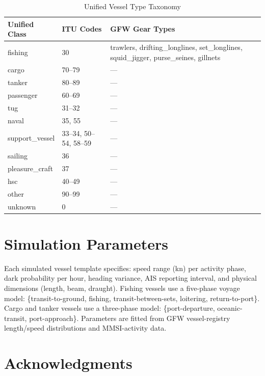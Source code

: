 \documentclass[journal]{IEEEtran}
\begin{document}
\begin{table}[!h]
  \caption{Unified Vessel Type Taxonomy}
  \label{tab:taxonomy}
  \centering
  \begin{tabular}{p{1.8cm}p{2.0cm}p{3.2cm}}
    \toprule
    Unified Class & ITU Codes & GFW Gear Types \\
    \midrule
    fishing        & 30        & trawlers, drifting\_longlines, set\_longlines,
                                  squid\_jigger, purse\_seines, gillnets \\
    cargo          & 70--79    & — \\
    tanker         & 80--89    & — \\
    passenger      & 60--69    & — \\
    tug            & 31--32    & — \\
    naval          & 35, 55    & — \\
    support\_vessel & 33--34, 50--54, 58--59 & — \\
    sailing        & 36        & — \\
    pleasure\_craft & 37       & — \\
    hsc            & 40--49    & — \\
    other          & 90--99    & — \\
    unknown        & 0         & — \\
    \bottomrule
  \end{tabular}
\end{table}

\section{Simulation Parameters}
\label{app:simulation}

Each simulated vessel template specifies: speed range (kn) per activity
phase, dark probability per hour, heading variance, AIS reporting interval,
and physical dimensions (length, beam, draught). Fishing vessels use a
five-phase voyage model: \{transit-to-ground, fishing, transit-between-sets,
loitering, return-to-port\}. Cargo and tanker vessels use a three-phase
model: \{port-departure, oceanic-transit, port-approach\}. Parameters are
fitted from GFW vessel-registry length/speed distributions and
MMSI-activity data.

\section*{Acknowledgments}
\end{document}
